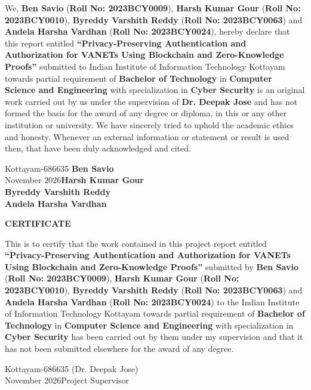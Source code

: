 \documentclass[12pt,a4paper]{report}
\theoremstyle{plain}
\theoremstyle{definition}
\theoremstyle{remark}
\newcommand{\projecttitle}{Privacy-Preserving Authentication and Authorization for VANETs Using Blockchain and Zero-Knowledge Proofs}
\newcommand{\reportdate}{November 2026}
\newcommand{\guide}{Dr. Deepak Jose}
\begin{document}
\sloppy\noindent We, \textbf{Ben Savio} (\textbf{Roll No: 2023BCY0009}), \textbf{Harsh Kumar Gour}
(\textbf{Roll No: 2023BCY0010}), \textbf{Byreddy Varshith Reddy} (\textbf{Roll No: 2023BCY0063})
and \textbf{Andela Harsha Vardhan} (\textbf{Roll No: 2023BCY0024}), hereby declare that this report
entitled \textbf{``\projecttitle''} submitted to Indian Institute of Information Technology Kottayam
towards partial requirement of {\bf Bachelor of Technology} in \textbf{Computer Science and
Engineering} with specialization in \textbf{Cyber Security} is an original work carried out by us
under the supervision of \textbf{\guide} and has not formed the basis for the award of any degree or
diploma, in this or any other institution or university. We have sincerely tried to uphold the
academic ethics and honesty. Whenever an external information or statement or result is used then,
that have been duly acknowledged and cited.

\vspace{2.5cm}
\noindent Kottayam-686635 \hfill \textbf{Ben Savio}\\
\noindent \reportdate \hfill \textbf{Harsh Kumar Gour}\\
\mbox{}\hfill \textbf{Byreddy Varshith Reddy}\\
\mbox{}\hfill \textbf{Andela Harsha Vardhan}
\clearpage

\begin{center}{\large\bf CERTIFICATE}\end{center}

\sloppy\noindent This is to certify that the work contained in this project report entitled
\textbf{``\projecttitle''} submitted by \textbf{Ben Savio} (\textbf{Roll No: 2023BCY0009}),
\textbf{Harsh Kumar Gour} (\textbf{Roll No: 2023BCY0010}), \textbf{Byreddy Varshith Reddy}
(\textbf{Roll No: 2023BCY0063}) and \textbf{Andela Harsha Vardhan} (\textbf{Roll No: 2023BCY0024})
to the Indian Institute of Information Technology Kottayam towards partial requirement of
{\bf Bachelor of Technology} in \textbf{Computer Science and Engineering} with specialization in
\textbf{Cyber Security} has been carried out by them under my supervision and that it has not been
submitted elsewhere for the award of any degree.

\vspace{4cm}
\noindent Kottayam-686635 \hfill (\guide)\\
\noindent \reportdate \hfill Project Supervisor
\clearpage
\end{document}
